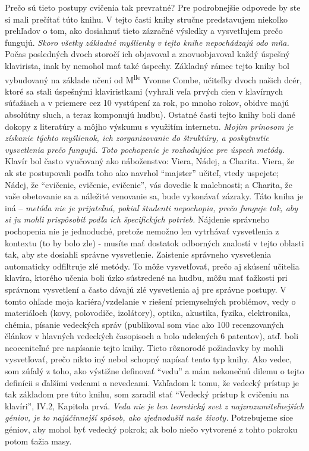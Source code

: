 Prečo sú tieto postupy cvičenia tak prevratné? Pre podrobnejšie odpovede by ste si mali prečítať túto knihu. V tejto časti knihy stručne predstavujem niekoľko prehľadov o tom, ako dosiahnuť tieto zázračné výsledky a vysvetľujem prečo fungujú. \emph{Skoro všetky základné myšlienky v tejto knihe nepochádzajú odo mňa.} Počas posledných dvoch storočí ich objavoval a znovuobjavoval každý úspešný klavirista, inak by nemohol mať také úspechy. Základný rámec tejto knihy bol vybudovaný na základe učení od M\textsuperscript{lle} Yvonne Combe, učiteľky dvoch našich dcér, ktoré sa stali úspešnými klaviristkami (vyhrali veľa prvých cien v klavírnych súťažiach a v priemere cez 10 vystúpení za rok, po mnoho rokov, obidve majú absolútny sluch, a teraz komponujú hudbu). Ostatné časti tejto knihy boli dané dokopy z literatúry a môjho výskumu s využitím internetu. \emph{Mojim prínosom je získanie týchto myšlienok, ich zorganizovanie do štruktúry, a poskytnutie vysvetlenia prečo fungujú. Toto pochopenie je rozhodujúce pre úspech metódy.} Klavír bol často vyučovaný ako náboženstvo: Viera, Nádej, a Charita. Viera, že ak ste postupovali podľa toho ako navrhol “majster” učiteľ, vtedy uspejete; Nádej, že “cvičenie, cvičenie, cvičenie”, vás dovedie k malebnosti; a Charita, že vaše obetovanie sa a náležité venovanie sa, bude vykonávať zázraky. Táto kniha je iná – \emph{metóda nie je prijateľná, pokiaľ študenti nepochopia, prečo funguje tak, aby si ju mohli prispôsobiť podľa ich špecifických potrieb.} Nájdenie správneho pochopenia nie je jednoduché, pretože nemožno len vytrhávať vysvetlenia z kontextu (to by bolo zle) - musíte mať dostatok odborných znalostí v tejto oblasti tak, aby ste dosiahli správne vysvetlenie. Zaistenie správneho vysvetlenia automaticky odfiltruje zlé metódy. To môže vysvetľovať, prečo aj skúsení učitelia klavíra, ktorého učenia boli úzko sústredené na hudbu, môžu mať ťažkosti pri správnom vysvetlení a často dávajú zlé vysvetlenia aj pre správne postupy. V tomto ohľade moja kariéra/vzdelanie v riešení priemyselných problémov, vedy o materiáloch (kovy, polovodiče, izolátory), optika, akustika, fyzika, elektronika, chémia, písanie vedeckých správ (publikoval som viac ako 100 recenzovaných článkov v hlavných vedeckých časopisoch a bolo udelených 6 patentov), atď. boli neoceniteľné pre napísanie tejto knihy. Tieto rôznorodé požiadavky by mohli vysvetľovať, prečo nikto iný nebol schopný napísať tento typ knihy. Ako vedec, som zúfalý z toho, ako výstižne definovať “vedu” a mám nekonečnú dilemu o tejto definícii s ďalšími vedcami a nevedcami. Vzhľadom k tomu, že vedecký prístup je tak základom pre túto knihu, som zaradil stať “Vedecký prístup k cvičeniu na klavíri”, IV.2, Kapitola prvá. \emph{Veda nie je len teoretický svet z najzrozumiteľnejších géniov, je to najúčinnejší spôsob, ako zjednodušiť naše životy.} Potrebujeme síce géniov, aby mohol byť vedecký pokrok; ak bolo niečo vytvorené z tohto pokroku potom ťažia masy.

